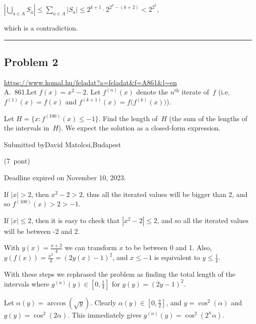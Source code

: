 \documentclass{article}
\begin{document}
\(\displaystyle \left|\bigcup_{a \in A} S_a \right| \leq \sum_{a \in A} |S_a| \leq 2^{k+1} \cdot 2^{2^k-(k+2)}<2^{2^k},\)

which is a contradiction.

\vspace{1em}
\hrule
\vspace{1em}

\subsection*{Problem 2}
\noindent\url{https://www.komal.hu/feladat?a=feladat&f=A861&l=en}\\[1em]

A. 861.Let \(\displaystyle f(x)=x^2-2\). Let \(\displaystyle f^{(n)}(x)\) denote the \(\displaystyle n^{\text{th}}\) iterate of \(\displaystyle f\) (i.e. \(\displaystyle f^{(1)}(x)=f(x)\) and \(\displaystyle f^{(k+1)}(x)=f\big(f^{(k)}(x)\big)\)).

Let \(\displaystyle H=\big\{x\colon f^{(100)}(x)\le -1\big\}\). Find the length of \(\displaystyle H\) (the sum of the lengths of the intervals in \(\displaystyle H\)). We expect the solution as a closed-form expression.

Submitted byDavid Matolcsi,Budapest

(7 pont)

Deadline expired on November 10, 2023.

If \(\displaystyle |x|>2\), then \(\displaystyle x^2-2>2\), thus all the iterated values will be bigger than 2, and so \(\displaystyle f^{(100)}(x)>2>-1\).

If \(\displaystyle |x|\le 2\), then it is easy to check that \(\displaystyle |x^2-2|\le 2\), and so all the iterated values will be between -2 and 2.

With \(\displaystyle y(x)=\frac{x+2}{4}\) we can transform \(\displaystyle x\) to be between 0 and 1. Also, \(\displaystyle y(f(x))=\frac{x^2}{4}=(2y(x)-1)^2\), and \(\displaystyle x\le -1\) is equivalent to \(\displaystyle y\le\frac{1}{4}\).

With these steps we rephrased the problem as finding the total length of the intervals where \(\displaystyle g^{(n)}(y)\in [0,\frac{1}{4}]\) for \(\displaystyle g(y)=(2y-1)^2\).

Let \(\displaystyle \alpha(y)=\arccos{(\sqrt{y})}\). Clearly \(\displaystyle \alpha(y)\in [0,\frac{\pi}{2}]\), and \(\displaystyle y=\cos^2(\alpha)\) and \(\displaystyle g(y)=\cos^2(2\alpha)\). This immediately gives \(\displaystyle g^{(n)}(y)=\cos^2(2^n \alpha)\).
\end{document}
